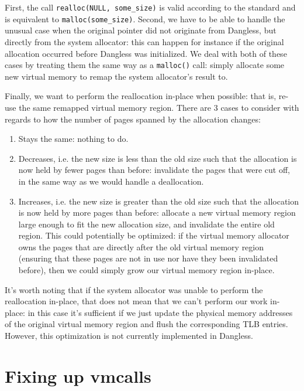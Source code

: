 First, the call \lstinline!realloc(NULL, some_size)! is valid according to the standard and is equivalent to \lstinline!malloc(some_size)!. Second, we have to be able to handle the unusual case when the original pointer did not originate from Dangless, but directly from the system allocator: this can happen for instance if the original allocation occurred before Dangless was initialized. We deal with both of these cases by treating them the same way as a \lstinline!malloc()! call: simply allocate some new virtual memory to remap the system allocator's result to.

Finally, we want to perform the reallocation in-place when possible: that is, re-use the same remapped virtual memory region. There are 3 cases to consider with regards to how the number of pages spanned by the allocation changes:

\begin{enumerate}
	\item Stays the same: nothing to do.
	\item Decreases, i.e. the new size is less than the old size such that the allocation is now held by fewer pages than before: invalidate the pages that were cut off, in the same way as we would handle a deallocation.
	\item Increases, i.e. the new size is greater than the old size such that the allocation is now held by more pages than before: allocate a new virtual memory region large enough to fit the new allocation size, and invalidate the entire old region. This could potentially be optimized: if the virtual memory allocator owns the pages that are directly after the old virtual memory region (ensuring that these pages are not in use nor have they been invalidated before), then we could simply grow our virtual memory region in-place.
\end{enumerate}

It's worth noting that if the system allocator was unable to perform the reallocation in-place, that does not mean that we can't perform our work in-place: in this case it's sufficient if we just update the physical memory addresses of the original virtual memory region and flush the corresponding TLB entries. However, this optimization is not currently implemented in Dangless.

\section{Fixing up vmcalls}
\label{sec:vmcall-pointer-rewriting}

